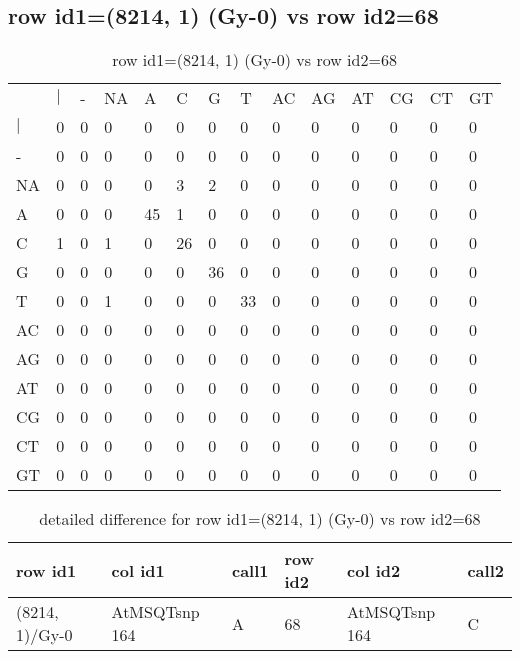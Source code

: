 \subsection{row id1=(8214, 1) (Gy-0) vs row id2=68}
\begin{center}
\begin{longtable}{|l|l|l|l|l|l|l|l|l|l|l|l|l|l|}
\caption{row id1=(8214, 1) (Gy-0) vs row id2=68} \label{table_dm346}\\
\hline
\\
\hline
&$|$&-&NA&A&C&G&T&AC&AG&AT&CG&CT&GT\\
$|$&0&0&0&0&0&0&0&0&0&0&0&0&0\\
-&0&0&0&0&0&0&0&0&0&0&0&0&0\\
NA&0&0&0&0&3&2&0&0&0&0&0&0&0\\
A&0&0&0&45&1&0&0&0&0&0&0&0&0\\
C&1&0&1&0&26&0&0&0&0&0&0&0&0\\
G&0&0&0&0&0&36&0&0&0&0&0&0&0\\
T&0&0&1&0&0&0&33&0&0&0&0&0&0\\
AC&0&0&0&0&0&0&0&0&0&0&0&0&0\\
AG&0&0&0&0&0&0&0&0&0&0&0&0&0\\
AT&0&0&0&0&0&0&0&0&0&0&0&0&0\\
CG&0&0&0&0&0&0&0&0&0&0&0&0&0\\
CT&0&0&0&0&0&0&0&0&0&0&0&0&0\\
GT&0&0&0&0&0&0&0&0&0&0&0&0&0\\
\hline
\end{longtable}
\end{center}

\begin{center}
\begin{longtable}{|l|l|l|l|l|l|}
\caption{detailed difference for row id1=(8214, 1) (Gy-0) vs row id2=68} \label{table_dm347}\\
\hline
row id1&col id1&call1&row id2&col id2&call2\\
\hline
(8214, 1)/Gy-0&AtMSQTsnp 164&A&68&AtMSQTsnp 164&C\\
\hline
\end{longtable}
\end{center}

